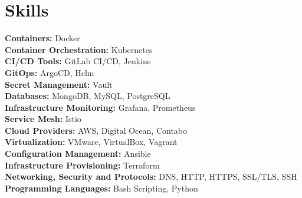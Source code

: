 \documentclass[letterpaper,11pt]{article}
\newcommand{\resumeSubHeadingListStart}{\begin{itemize}[leftmargin=0.15in, label={}]}
\newcommand{\resumeSubHeadingListEnd}{\end{itemize}}
\begin{document}
\section{Skills}
  \vspace{3pt}
  \resumeSubHeadingListStart
    \small{\item{
        \textbf{Containers:} Docker \\ \vspace{3pt}
        \textbf{Container Orchestration:} Kubernetes \\ \vspace{3pt}
        \textbf{CI/CD Tools:} GitLab CI/CD, Jenkins \\ \vspace{3pt}
        \textbf{GitOps:} ArgoCD, Helm \\ \vspace{3pt}
        \textbf{Secret Management:} Vault \\ \vspace{3pt}
        \textbf{Databases:} MongoDB, MySQL, PostgreSQL \\ \vspace{3pt}
        \textbf{Infrastructure Monitoring:} Grafana, Prometheus \\ \vspace{3pt}
        \textbf{Service Mesh:} Istio \\ \vspace{3pt}
        \textbf{Cloud Providers:} AWS, Digital Ocean, Contabo \\ \vspace{3pt}
        \textbf{Virtualization:} VMware, VirtualBox, Vagrant \\ \vspace{3pt}
        \textbf{Configuration Management:} Ansible \\ \vspace{3pt}
        \textbf{Infrastructure Provisioning:} Terraform \\ \vspace{3pt}
        \textbf{Networking, Security and Protocols:} DNS, HTTP, HTTPS, SSL/TLS, SSH \\ \vspace{3pt}
        \textbf{Programming Languages:} Bash Scripting, Python \\ \vspace{3pt}
    }}
  \resumeSubHeadingListEnd
\end{document}
